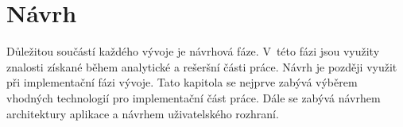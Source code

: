 \chapter{Návrh}\label{kapitola-navrh}
Důležitou součástí každého vývoje je návrhová fáze. V~této fázi jsou využity znalosti získané během analytické a rešeršní části práce. Návrh je později využit při implementační fázi vývoje. Tato kapitola se nejprve zabývá výběrem vhodných technologií pro implementační část práce.
Dále se zabývá návrhem architektury aplikace a návrhem uživatelského rozhraní.




